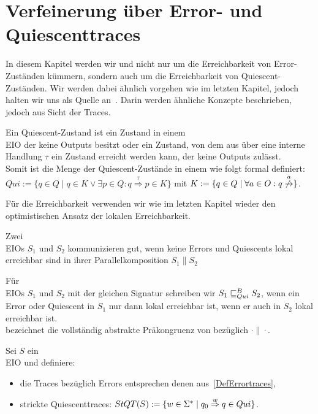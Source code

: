 \chapter{Verfeinerung über Error- und Quiescenttraces}

In diesem Kapitel werden wir und nicht nur um die Erreichbarkeit von
Error-Zuständen kümmern, sondern auch um die Erreichbarkeit von
Quiescent-Zuständen. Wir werden dabei ähnlich vorgehen wie im letzten Kapitel,
jedoch halten wir uns als Quelle an~\cite{Chilton2013}. Darin werden ähnliche Konzepte
beschrieben, jedoch aus Sicht der Traces.

\begin{Def}[Quiescent]
  Ein Quiescent-Zustand ist ein Zustand in einem \\EIO{}{} der keine Outputs besitzt
  oder ein Zustand, von dem aus über eine interne Handlung $\tau$ ein Zustand
  erreicht werden kann, der keine Outputs zulässt.\\
  Somit ist die Menge der Quiescent-Zustände in einem \EIO{} wie folgt formal
  definiert: $Qui:=\{q\in Q\mid q\in K\vee \exists p\in Q:
  q\overset{\tau}{\Rightarrow} p\in K\}$ mit $K:=\{q\in Q\mid \forall a\in O:
  q\overset{a}{\not{\hspace{-0.1cm}\rightarrow}}\}$.
\end{Def}

Für die Erreichbarkeit verwenden wir wie im letzten Kapitel wieder den
optimistischen Ansatz der lokalen Erreichbarkeit.

\begin{Def}
  Zwei \\EIO{}{}s $S_1$ und $S_2$ kommunizieren gut, wenn keine Errors und Quiescents
  lokal erreichbar sind in ihrer Parallelkomposition $S_1\| S_2$
\end{Def}

\begin{Def}
  Für \\EIO{}{}s $S_1$ und $S_2$ mit der gleichen Signatur schreiben wir
  $S_1\sqsubseteq _{Qui}^B S_2$, wenn ein Error oder Quiescent in $S_1$ nur
  dann lokal erreichbar ist, wenn er auch in $S_2$ lokal erreichbar ist.\\
  \QCRel{} bezeichnet die vollständig abstrakte Präkongruenz von \QBRel{}
  bezüglich $\cdot\|\cdot$.
\end{Def}

\begin{Def}
  \label{DefQuiescenttraces}
  Sei $S$ ein \\EIO{}{} und definiere:
  \begin{itemize}
    \item die Traces bezüglich Errors entsprechen denen
      aus~\ref{DefErrortraces},
    \item strickte Quiescenttraces: $StQT{}(S) := \{w\in\Sigma ^*\mid q_0
      \overset{w}{\Rightarrow} q\in Qui\}$.
  \end{itemize}
\end{Def}

